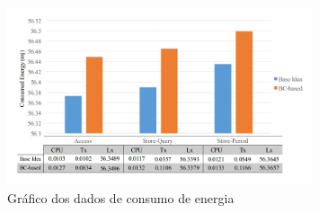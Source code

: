 \begin{itemize}
    \begin{figure}[H]
        \centering
        \includegraphics[width=0.8\textwidth]{pictures/results2.jpg}
        \caption{Gráfico dos dados de consumo de energia}
        \label{fig:my_label}
    \end{figure}{}
\end{itemize}{}
